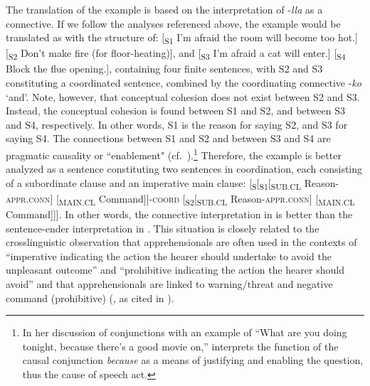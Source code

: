 \documentclass[output=paper,colorlinks,citecolor=brown]{langscibook}
\begin{document}
\noindent The translation  of the example is based on the interpretation of \nobreakdash-\textit{lla} as a connective. If we follow the analyses referenced above, the example would be translated as  with the structure of: [\textsubscript{S1} I'm afraid the room will become too hot.] [\textsubscript{S2} Don't make fire (for floor-heating)], and [\textsubscript{S3} I'm afraid a cat will enter.] [\textsubscript{S4} Block the flue opening.], containing four finite sentences, with S2 and S3 constituting a coordinated sentence, combined by the coordinating connective \nobreakdash-\textit{ko} `and'. Note, however, that conceptual cohesion does not exist between S2 and S3. Instead, the conceptual cohesion is found between S1 and S2, and between S3 and S4, respectively. In other words, S1 is the reason for saying S2, and S3 for saying S4. The connections between S1 and S2 and between S3 and S4 are pragmatic causality or ``enablement" (cf.\ \citealt[77]{Sweetser1990}).\footnote{In her discussion of conjunctions with an example of ``What are you doing tonight, because there's a good movie on,'' \citet[77]{Sweetser1990} interprets the function of the causal conjunction \textit{because} as a means of justifying and enabling the question, thus the cause of speech act.} Therefore, the example is better analyzed as a sentence constituting two sentences in coordination, each consisting of a subordinate clause and an imperative main  clause: [\textsubscript{S}[\textsubscript{S1}[\textsubscript{SUB.CL} Reason-\textsc{appr.conn}] [\textsubscript{MAIN.CL} Command]]-\textsc{coord} [\textsubscript{S2}[\textsubscript{SUB.CL} Reason-\textsc{appr.conn}] [\textsubscript{MAIN.CL} Command]]]. In other words, the connective interpretation in  is better than the sentence-ender interpretation in . This situation is closely related to the crosslinguistic observation that apprehensionals are often used in the contexts of ``imperative indicating the action the hearer should undertake to avoid the unpleasant outcome'' and ``prohibitive indicating the action the hearer should avoid'' \citep{Schultze-Berndt2015} and that apprehensionals are linked to warning/threat and negative command (prohibitive) (\citealt{pakendorfschalley2007}, as cited in \citealt{Schultze-Berndt2015}).
\end{document}
